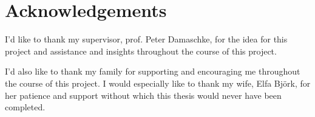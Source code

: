 \chapter*{Acknowledgements}
\thispagestyle{empty}
I'd like to thank my supervisor, prof. Peter Damaschke, for the idea for this project and assistance and insights throughout the course of this project.

I'd also like to thank my family for supporting and encouraging me throughout the course of this project. I would especially like to thank my wife, Elfa Björk, for her patience and support without which this thesis would never have been completed.

\clearpage
